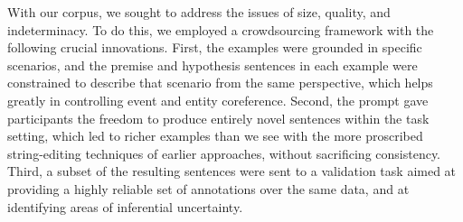 With our corpus, we sought to address the issues of size, quality, and
indeterminacy. To do this, we employed a crowdsourcing framework with
the following crucial innovations. First, the examples were grounded
in specific scenarios, and the premise and hypothesis sentences in each example 
were constrained to describe that scenario from the same perspective, 
which helps greatly in controlling event and entity coreference. Second, the prompt
gave participants the freedom to produce entirely novel sentences
within the task setting, which led to richer examples than we see with
the more proscribed string-editing techniques of earlier approaches,
without sacrificing consistency. Third, a subset of the resulting
sentences were sent to a validation task aimed at providing a highly 
reliable set of annotations over the same data, and at identifying areas of inferential uncertainty.






